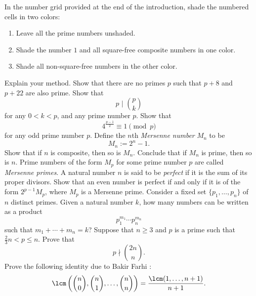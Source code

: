 \begin{exercises}
  \exercise \label{exercise:shading} In the number grid provided at the end of the introduction, shade the numbered cells in two colors:
  \begin{enumerate}
  \item Leave all the prime numbers unshaded.
  \item Shade the number $1$ and all square-free composite numbers in one color.
  \item Shade all non-square-free numbers in the other color.
  \end{enumerate}
  Explain your method.
  \exercise Show that there are no primes $p$ such that $p+8$ and $p+22$ are also prime.
  \exercise Show that
  \begin{equation*}
    p\,\,\Big|\,\, \binom{p}{k}
  \end{equation*}
  for any $0<k<p$, and any prime number $p$.
  \exercise Show that
  \begin{equation*}
    4^{\frac{p-1}{2}}\equiv 1\pmod{p}
  \end{equation*}
  for any odd prime number $p$.
  \exercise Define the $n$th \emph{Mersenne number} $M_n$ to be
  \begin{equation*}
    M_n:=2^n-1.
  \end{equation*}
  Show that if $n$ is composite, then so is $M_n$. Conclude that if $M_n$ is prime, then so is $n$. Prime numbers of the form $M_p$ for some prime number $p$ are called \emph{Mersenne primes}.
  \exercise A natural number $n$ is said to be \emph{perfect} if it is the sum of its proper divisors. Show that an even number is perfect if and only if it is of the form $2^{p-1}M_p$, where $M_p$ is a Mersenne prime.
  \exercise Consider a fixed set $\{p_1,\ldots,p_n\}$ of $n$ distinct primes. Given a natural number $k$, how many numbers can be written as a product
  \begin{equation*}
    p_1^{m_1}\cdots p_n^{m_n}
  \end{equation*}
  such that $m_1+\cdots +m_n=k$?
  \exercise Suppose that $n\geq 3$ and $p$ is a prime such that $\frac{2}{3}n<p\leq n$. Prove that
  \begin{equation*}
    p\nmid \binom{2n}{n}.
  \end{equation*}
  \exercise Prove the following identity due to Bakir Farhi \cite{farhi2009}:
  \begin{equation*}
    \lcm\left(\binom{n}{0},\binom{n}{1},\ldots,\binom{n}{n}\right)=
    \frac{\lcm(1,\ldots,n+1)}{n+1}.
  \end{equation*}
\end{exercises}

